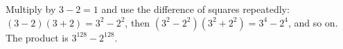 Multiply by $3-2=1$ and use the difference of squares repeatedly: $(3-2)(3+2)=3^2-2^2$, then $(3^2-2^2)(3^2+2^2)=3^4-2^4$, and so on. The product is $\boxed{3^{128}-2^{128}}$.
